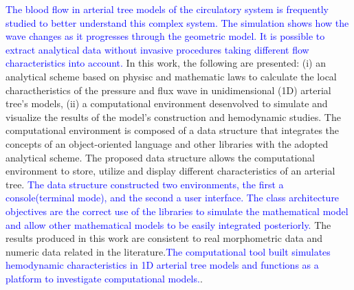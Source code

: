 \documentclass[dsc,divps,pdftex]{mmc}
\newcommand{\igunew}[1]{\textcolor{blue}{#1}}
\begin{document}
\begin{foreignabstract}
	\justifying
	\igunew{The blood flow in arterial tree models of the circulatory system is frequently studied to better understand this complex system. The simulation shows how the wave changes as it progresses through the geometric model. It is possible to extract analytical data without invasive procedures taking different flow characteristics into account.}
	In this work, the following are presented: (i) an analytical scheme based on physisc and mathematic laws to calculate the local charactheristics of the pressure and flux wave in unidimensional (1D) arterial tree's models, (ii) a computational environment desenvolved to simulate and visualize the results of the model's construction and hemodynamic studies. 
	The computational environment is composed of a data structure that integrates the concepts of an object-oriented language and other libraries with the adopted analytical scheme.
	The proposed data structure allows the computational environment to store, utilize and display different characteristics of an arterial tree. \igunew{The data structure constructed two environments, the first a console(terminal mode), and the second a user interface. The class architecture objectives are the correct use of the libraries to simulate the mathematical model and allow other mathematical models to be easily integrated posteriorly.}
	The results produced in this work are consistent to real morphometric data and numeric data related in the literature.\igunew{The computational tool built simulates hemodynamic characteristics in 1D arterial tree models and functions as a platform to investigate computational models.}.
\end{foreignabstract}





\listoffigures  %
\listoftables


\tableofcontents




\mainmatter


%
%
%
 
\end{document}

